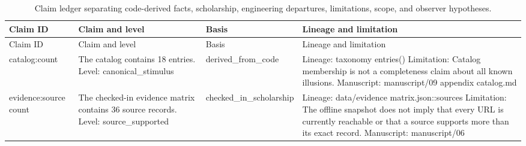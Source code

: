\documentclass[
  english,
]{article}
\begin{document}
\begin{longtable}[]{@{}
  >{\raggedright\arraybackslash}p{}
  >{\raggedright\arraybackslash}p{}
  >{\raggedright\arraybackslash}p{}
  >{\raggedright\arraybackslash}p{}@{}}
\caption{Claim ledger separating code-derived facts, scholarship,
engineering departures, limitations, scope, and observer
hypotheses.}\label{tbl:claim_ledger}\tabularnewline
\toprule\noalign{}
\begin{minipage}[b]{\linewidth}\raggedright
Claim ID
\end{minipage} & \begin{minipage}[b]{\linewidth}\raggedright
Claim and level
\end{minipage} & \begin{minipage}[b]{\linewidth}\raggedright
Basis
\end{minipage} & \begin{minipage}[b]{\linewidth}\raggedright
Lineage and limitation
\end{minipage} \\
\midrule\noalign{}
\endfirsthead
\toprule\noalign{}
\begin{minipage}[b]{\linewidth}\raggedright
Claim ID
\end{minipage} & \begin{minipage}[b]{\linewidth}\raggedright
Claim and level
\end{minipage} & \begin{minipage}[b]{\linewidth}\raggedright
Basis
\end{minipage} & \begin{minipage}[b]{\linewidth}\raggedright
Lineage and limitation
\end{minipage} \\
\midrule\noalign{}
\endhead
\bottomrule\noalign{}
\endlastfoot
catalog:count & The catalog contains 18 entries. Level:
canonical\_stimulus & derived\_from\_code & Lineage: taxonomy entries()
Limitation: Catalog membership is not a completeness claim about all
known illusions. Manuscript: manuscript/09 appendix catalog.md \\
evidence:source count & The checked-in evidence matrix contains 36
source records. Level: source\_supported & checked\_in\_scholarship &
Lineage: data/evidence matrix.json::sources Limitation: The offline
snapshot does not imply that every URL is currently reachable or that a
source supports more than its exact record. Manuscript: manuscript/06

\end{longtable}
\end{document}
